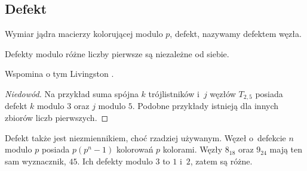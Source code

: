 
\subsection{Defekt}
%
\begin{definition}[defekt]
    Wymiar jądra macierzy kolorującej modulo $p$, defekt, nazywamy defektem węzła.
\end{definition}

\begin{proposition}
\label{no_relation_defects}%
    Defekty modulo różne liczby pierwsze są niezależne od siebie.
\end{proposition}

Wspomina o tym Livingston \cite[s. 145]{livingston93}.

\begin{proof}[Niedowód]
    Na przykład suma spójna $k$ trójlistników i~$j$ węzłów $T_{2,5}$ posiada defekt $k$ modulo $3$ oraz $j$ modulo $5$.
    Podobne przykłady istnieją dla innych zbiorów liczb pierwszych.
\end{proof}

Defekt także jest niezmiennikiem, choć rzadziej używanym.
Węzeł o~defekcie $n$ modulo $p$ posiada $p(p^n-1)$ kolorowań $p$ kolorami.
Węzły $8_{18}$ oraz $9_{24}$ mają ten sam wyznacznik, $45$.
Ich defekty modulo $3$ to $1$ i~$2$, zatem są różne.
%

